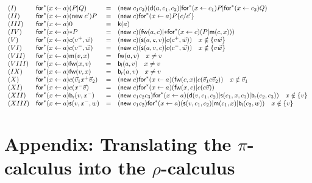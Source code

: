 \documentclass[submission,copyright,creativecommons]{eptcs}
\newcommand{\pic}{$\pi$-calculus}
\newcommand{\pzero}{\mathbin{0}}
\newcommand{\substn}[2]{\{ #1 / #2 \}}
\newcommand{\rhoc}{$\rho$-calculus}
\theoremstyle{definition}
\theoremstyle{remark}
\theoremstyle{remark}
\begin{document}
\[\begin{array}{llrl}
(I)&\mathsf{for}^*(x \leftarrow a)(P|Q) &=& (\mathsf{new}\; c_1c_2)(\mathsf{d}(a,c_1,c_2) | \mathsf{for}^*(x \leftarrow c_1)P | \mathsf{for}^*(x \leftarrow c_2)Q)\\
(II)&\mathsf{for}^*(x \leftarrow a)(\mathsf{new}\; c')P &=& (\mathsf{new}\; c)\mathsf{for}^*(x \leftarrow a)P\substn{c}{c'} \\
(III)& \mathsf{for}^*(x \leftarrow a)\pzero &=& \mathsf{k}(a) \\
(IV)&\mathsf{for}^*(x \leftarrow a)\mathsf{*}P &=& (\mathsf{new}\;c)(\mathsf{fw}(a,c) | \mathsf{*}\mathsf{for}^*(x \leftarrow c)(P | \mathsf{m}(c,x)))\\
(V)&\mathsf{for}^*(x \leftarrow a)c(v^+,\vec{w}) &=& (\mathsf{new}\;c)(\mathsf{s}(a,c,v) | c(c^+,\vec{w})) \mbox{\quad $x \notin \{v\vec{w}\}$}\\
(VI)&\mathsf{for}^*(x \leftarrow a)c(v^-,\vec{w})&=& (\mathsf{new}\;c)(\mathsf{s}(a,v,c) | c(c^-,\vec{w})) \mbox{\quad $x \notin \{v\vec{w}\}$}\\
(VII)&\mathsf{for}^*(x \leftarrow a)\mathsf{m}(v,x)&=& \mathsf{fw}(a,v) \mbox{\quad $x \neq v$}\\
(VIII)&\mathsf{for}^*(x \leftarrow a)\mathsf{fw}(x,v)&=& \mathsf{b}_{\mathsf{l}}(a,v) \mbox{\quad $x \neq v$}\\
(IX)&\mathsf{for}^*(x \leftarrow a)\mathsf{fw}(v,x)&=& \mathsf{b}_{\mathsf{r}}(a,v) \mbox{\quad $x \neq v$}\\
(X)&\mathsf{for}^*(x \leftarrow a)c(\vec{v}_1x^+\vec{v}_2)&=&(\mathsf{new}\; c)\mathsf{for}^*(x \leftarrow a)(\mathsf{fw}(c,x) | c(\vec{v}_1c\vec{v}_2)) \mbox{\quad $x \notin \vec{v}_1$}\\
(XI)&\mathsf{for}^*(x \leftarrow a)c(x^-\vec{v})&=& (\mathsf{new}\; c)\mathsf{for}^*(x \leftarrow a)(\mathsf{fw}(x,c) | c(c\vec{v}))\\
(XII)&\mathsf{for}^*(x \leftarrow a)\mathsf{b}_{\mathsf{r}}(v,x^-)&=& (\mathsf{new}\; c_1c_2c_3)\mathsf{for}^*(x \leftarrow a)(\mathsf{d}(v,c_1,c_2)|\mathsf{s}(c_1,x,c_3)|\mathsf{b}_{\mathsf{r}}(c_2,c_3)) \mbox{\quad $x \notin \{v \}$}\\
(XIII)&\mathsf{for}^*(x \leftarrow a)\mathsf{s}(v,x^-,w) &=& (\mathsf{new}\; c_1c_2)\mathsf{for}^*(x \leftarrow a)(\mathsf{s}(v,c_1,c_2) | \mathsf{m}(c_1,x) | \mathsf{b}_{\mathsf{l}}(c_2,w)) \mbox{\quad $x \notin \{v \}$}
\end{array}\]

\section{Appendix: Translating the {\pic} into the {\rhoc}} \label{appendix:pic2rhoc}
\end{document}
